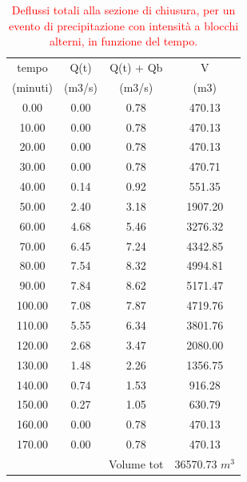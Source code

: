\begin{table}[H] \centering
    \caption{\textcolor{red}{Deflussi totali alla sezione di chiusura, per un evento di precipitazione con intensità a blocchi alterni, in funzione del tempo.}}
        \begin{tabular}{cccc}
        \toprule
        tempo        & Q(t)       & Q(t) + Qb  & V        \\
        (minuti)     & (m3/s)     & (m3/s)     & (m3)     \\
        \midrule
        0.00         & 0.00       & 0.78       & 470.13   \\
        10.00        & 0.00       & 0.78       & 470.13   \\
        20.00        & 0.00       & 0.78       & 470.13   \\
        30.00        & 0.00       & 0.78       & 470.71   \\
        40.00        & 0.14       & 0.92       & 551.35   \\
        50.00        & 2.40       & 3.18       & 1907.20  \\
        60.00        & 4.68       & 5.46       & 3276.32  \\
        70.00        & 6.45       & 7.24       & 4342.85  \\
        80.00        & 7.54       & 8.32       & 4994.81  \\
        90.00        & 7.84       & 8.62       & 5171.47  \\
        100.00       & 7.08       & 7.87       & 4719.76  \\
        110.00       & 5.55       & 6.34       & 3801.76  \\
        120.00       & 2.68       & 3.47       & 2080.00  \\
        130.00       & 1.48       & 2.26       & 1356.75  \\
        140.00       & 0.74       & 1.53       & 916.28   \\
        150.00       & 0.27       & 1.05       & 630.79   \\
        160.00       & 0.00       & 0.78       & 470.13   \\
        170.00       & 0.00       & 0.78       & 470.13   \\
                     &            & Volume tot & 36570.73 $m^3$ \\
        \bottomrule
        \end{tabular}
        \end{table}

